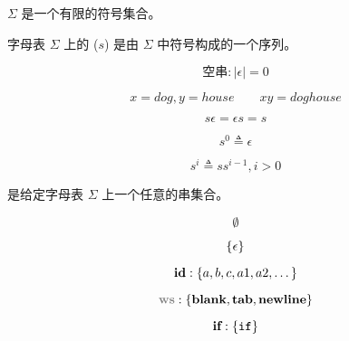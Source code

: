 
\begin{frame}{}
  \begin{center}

    \pause
    \vspace{0.30cm}
  \end{center}
\end{frame}

\begin{frame}{}
  \begin{definition}[字母表]
     $\Sigma$ 是一个有限的符号集合。
  \end{definition}

\end{frame}

\begin{frame}{}
  \begin{definition}[串]
    字母表 $\Sigma$ 上的 ($s$) 是由 $\Sigma$ 中符号构成的一个序列。
  \end{definition}

  \vspace{-0.30cm}
  \[
    \text{空串}: |\epsilon| = 0
  \]
\end{frame}

\begin{frame}{}
  \begin{definition}[串上的``连接''运算]
    \[
      x = dog, y = house \qquad xy = doghouse
    \]

    \[
      s \epsilon = \epsilon s = s
    \]
  \end{definition}

  \pause
  \vspace{0.60cm}
  \begin{definition}[串上的``指数''运算]
    \[
      s^{0} \triangleq \epsilon
    \]

    \[
      s^{i} \triangleq s s^{i-1}, i > 0
    \]
  \end{definition}
\end{frame}

\begin{frame}{}
  \begin{definition}[语言]
    是给定字母表 $\Sigma$ 上一个任意的串集合。
  \end{definition}

  \[
    \emptyset
  \]

  \[
    \{\epsilon\}
  \]

  \pause
  \[
    \text{\bf id}: \{a, b, c, a1, a2, \dots\}
  \]

  \[
    \ws: \set{\blank, \tab, \line}
  \]

  \[
    \text{\bf if}: \{\texttt{if}\}
  \]
\end{frame}

